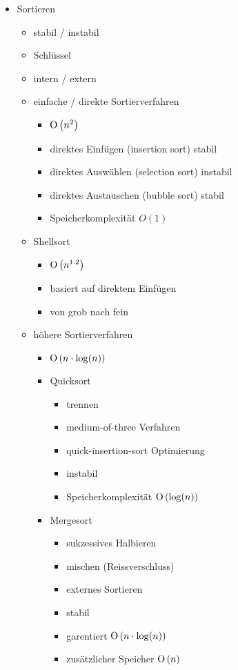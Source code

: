 \begin{itemize}
    \item Sortieren
    \begin{itemize}
        \item stabil / instabil
        \item Schlüssel
        \item intern / extern
        
        \item einfache / direkte Sortierverfahren
        \begin{itemize}
            \item $\operatorname{O}\left(n^2\right)$
            \item direktes Einfügen (insertion sort)
            stabil
            \item direktes Auswählen (selection sort)
            instabil
            \item direktes Austauschen (bubble sort)
            stabil
            \item Speicherkomplexität $O(1)$
        \end{itemize}
        
        \item Shellsort
        \begin{itemize}
            \item $\operatorname{O}\left(n^{1.2}\right)$
            \item basiert auf direktem Einfügen
            \item von grob nach fein
        \end{itemize}
        
        \item höhere Sortierverfahren
        \begin{itemize}
            \item $\operatorname{O}\left(n \cdot \log(n)\right)$
            \item Quicksort
            \begin{itemize}
                \item trennen
                \item medium-of-three Verfahren
                \item quick-insertion-sort Optimierung
                \item instabil
                \item Speicherkomplexität $\operatorname{O}\left(\log(n)\right)$
            \end{itemize}
            \item Mergesort
            \begin{itemize}
                \item sukzessives Halbieren
                \item mischen (Reissverschluss)
                \item externes Sortieren
                \item stabil
                \item garentiert $\operatorname{O}\left(n \cdot \log(n)\right)$
                \item zusätzlicher Speicher $\operatorname{O}\left(n\right)$
            \end{itemize}
        \end{itemize}
    \end{itemize}
    

\end{itemize}
